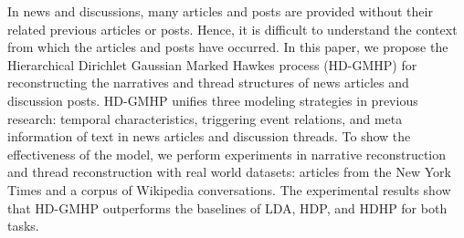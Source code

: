 In news and discussions, many articles and posts are provided without their related previous articles or posts. Hence, it is difficult to understand the context from which the articles and posts have occurred. In this paper, we propose the Hierarchical Dirichlet Gaussian Marked Hawkes process (HD-GMHP) for reconstructing the narratives and thread structures of news articles and discussion posts. HD-GMHP unifies three modeling strategies in previous research: temporal characteristics, triggering event relations, and meta information of text in news articles and discussion threads. To show the effectiveness of the model, we perform experiments in narrative reconstruction and thread reconstruction with real world datasets: articles from the New York Times and a corpus of Wikipedia conversations. The experimental results show that HD-GMHP outperforms the baselines of LDA, HDP, and HDHP for both tasks.
